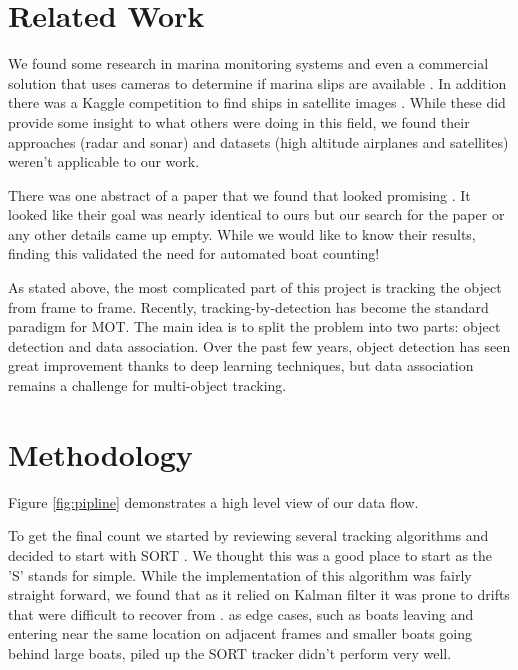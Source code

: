 \documentclass[10pt,twocolumn,letterpaper]{article}
\begin{document}
\section{Related Work}

We found some research in marina monitoring systems \cite{marina_boatdetector} and even a commercial solution that uses cameras to determine if marina slips are available \cite{Nuvis}. In addition there was a Kaggle competition to find ships in satellite images \cite{kaggle_ship_detection, Stofa_2020}. While these did provide some insight to what others were doing in this field, we found their approaches (radar and sonar) and datasets (high altitude airplanes and satellites) weren't applicable to our work.

There was one abstract of a paper that we found that looked promising \cite{UCalagary}. It looked like their goal was nearly identical to ours but our search for the paper or any other details came up empty. While we would like to know their results, finding this validated the need for automated boat counting!

As stated above, the most complicated part of this project is tracking the object from frame to frame. Recently, tracking-by-detection has become the standard paradigm for MOT. The main idea is to split the problem into two parts: object detection and data association. Over the past few years, object detection has seen great improvement thanks to deep learning techniques\cite{https://doi.org/10.48550/arxiv.1506.01497}, but data association remains a challenge for multi-object tracking.

\section{Methodology}

Figure \ref{fig:pipline} demonstrates a high level view of our data flow. 

To get the final count we started by reviewing several tracking algorithms and decided to start with SORT \cite{Bewley_2016}. We thought this was a good place to start as the 'S' stands for simple. While the implementation of this algorithm was fairly straight forward, we found that as it relied on Kalman filter it was prone to drifts that were difficult to recover from \cite{10.1007/978-3-540-24670-1_3}. as edge cases, such as boats leaving and entering near the same location on adjacent frames and smaller boats going behind large boats, piled up the SORT tracker didn't perform very well. 
\end{document}
